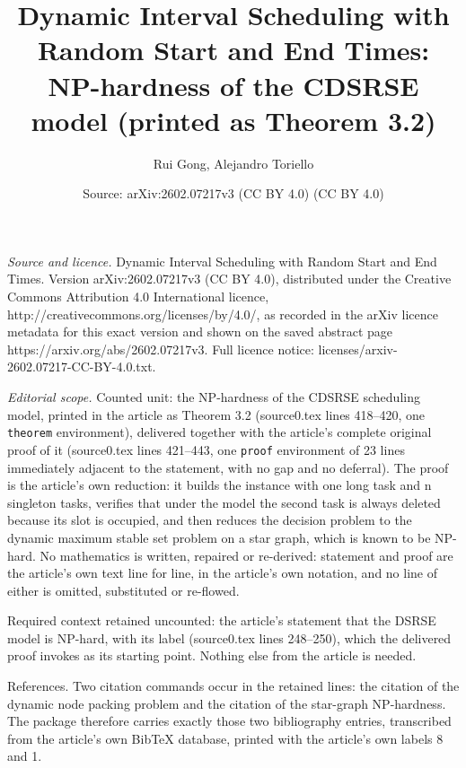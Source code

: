 \documentclass[10pt,a4paper]{amsart}
\title[Dynamic Interval Scheduling with Random Start and End Times]{Dynamic Interval Scheduling with Random Start and End Times: NP-hardness of the CDSRSE model (printed as Theorem 3.2)}
\author{Rui Gong, Alejandro Toriello}
\date{Source: arXiv:2602.07217v3 (CC BY 4.0) (CC BY 4.0)}
\theoremstyle{plain}
\theoremstyle{definition}
\theoremstyle{remark}
\begin{document}
\maketitle

\noindent\emph{Source and licence.} Dynamic Interval Scheduling with Random Start and End Times. Version arXiv:2602.07217v3 (CC BY 4.0), distributed under the Creative Commons Attribution 4.0 International licence, http://creativecommons.org/licenses/by/4.0/, as recorded in the arXiv licence metadata for this exact version and shown on the saved abstract page https://arxiv.org/abs/2602.07217v3. Full licence notice: licenses/arxiv-2602.07217-CC-BY-4.0.txt.\par\smallskip

\noindent\textit{Editorial scope.} Counted unit: the NP-hardness of the CDSRSE scheduling model, printed in the article as Theorem 3.2 (source0.tex lines 418--420, one \texttt{theorem} environment), delivered together with the article's complete original proof of it (source0.tex lines 421--443, one \texttt{proof} environment of 23 lines immediately adjacent to the statement, with no gap and no deferral). The proof is the article's own reduction: it builds the instance with one long task and n singleton tasks, verifies that under the model the second task is always deleted because its slot is occupied, and then reduces the decision problem to the dynamic maximum stable set problem on a star graph, which is known to be NP-hard. No mathematics is written, repaired or re-derived: statement and proof are the article's own text line for line, in the article's own notation, and no line of either is omitted, substituted or re-flowed.

Required context retained uncounted: the article's statement that the DSRSE model is NP-hard, with its label (source0.tex lines 248--250), which the delivered proof invokes as its starting point. Nothing else from the article is needed.

References. Two citation commands occur in the retained lines: the citation of the dynamic node packing problem and the citation of the star-graph NP-hardness. The package therefore carries exactly those two bibliography entries, transcribed from the article's own BibTeX database, printed with the article's own labels 8 and 1.
\end{document}
